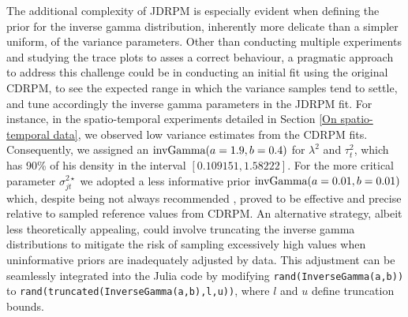\documentclass[12pt,	%
	a4paper,		%
	twoside,		%
	openright,		%
	titlepage,%
	]{book}
\theoremstyle{definition}
\let\cite\citep
\newcommand{\mjline}[1]{\texttt{#1}}
\begin{document}

The additional complexity of JDRPM is especially evident when defining the prior for the inverse gamma distribution, inherently more delicate than a simpler uniform, of the variance parameters. Other than conducting multiple experiments and studying the trace plots to asses a correct behaviour, a pragmatic approach to address this challenge could be in conducting an initial fit using the original CDRPM, to see the expected range in which the variance samples tend to settle, and tune accordingly the inverse gamma parameters in the JDRPM fit. For instance, in the spatio-temporal experiments detailed in Section \ref{On spatio-temporal data}, we observed low variance estimates from the CDRPM fits. Consequently, we assigned an $\text{invGamma}(a=1.9, b=0.4)$ for $\lambda^2$ and $\tau^2_t$, which has 90\% of his density in the interval $[0.109151, 1.58222]$. For the more critical parameter $\sigma^{2\star}_{jt}$ we adopted a less informative prior $\text{invGamma}(a=0.01, b=0.01)$ which, despite being not always recommended \cite{paper-28-prior-variance}, proved to be effective and precise relative to sampled reference values from CDRPM. An alternative strategy, albeit less theoretically appealing, could involve truncating the inverse gamma distributions to mitigate the risk of sampling excessively high values when uninformative priors are inadequately adjusted by data. This adjustment can be seamlessly integrated into the Julia code by modifying \mjline{rand(InverseGamma(a,b))} to \mjline{rand(truncated(InverseGamma(a,b),l,u))}, where $l$ and $u$ define truncation bounds.
\end{document}
